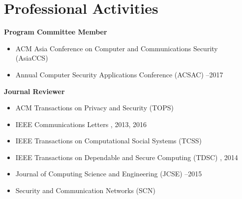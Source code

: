 \section*{Professional Activities}
\begin{description}
\item {\bf Program Committee Member}
  \begin{itemize}
  \item ACM Asia Conference on Computer and Communications Security (AsiaCCS)
  \item Annual Computer Security Applications Conference (ACSAC)
    --2017
  \end{itemize}

\item {\bf Journal Reviewer}
  \begin{itemize}
  \item ACM Transactions on Privacy and Security (TOPS)
  \item IEEE Communications Letters
    , 2013, 2016
  \item IEEE Transactions on Computational Social Systems (TCSS)
  \item IEEE Transactions on Dependable and Secure Computing (TDSC)
    , 2014
  \item Journal of Computing Science and Engineering (JCSE)
    --2015
  \item Security and Communication Networks (SCN)
  \end{itemize}

\end{description}
